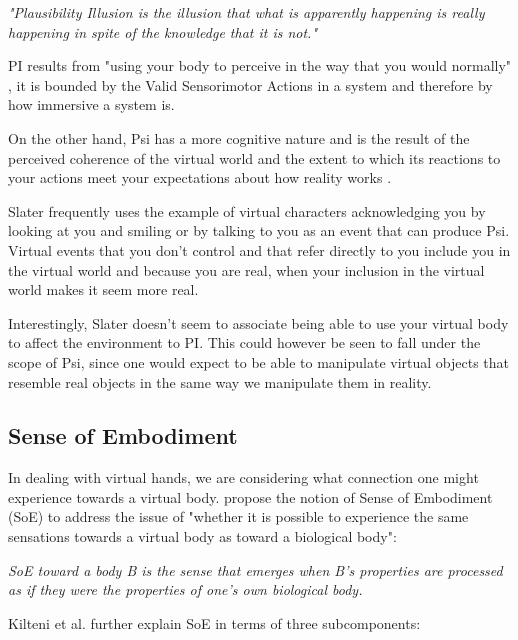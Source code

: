 \begin{displayquote}
\textit{"Plausibility Illusion is the illusion that what is apparently happening is really happening in spite of the knowledge that it is not."}
\end{displayquote}

PI results from "using your body to perceive in the way that you would normally" \parencite{Slater2015}, it is bounded by the Valid Sensorimotor Actions in a system and therefore by how immersive a system is.

On the other hand, Psi has a more cognitive nature and is the result of the perceived coherence of the virtual world and the extent to which its reactions to your actions meet your expectations about how reality works \parencite{Slater2015}.

Slater frequently uses the example of virtual characters acknowledging you by looking at you and smiling or by talking to you as an event that can produce Psi. Virtual events that you don't control and that refer directly to you include you in the virtual world and because you are real, when your inclusion in the virtual world makes it seem more real.

Interestingly, Slater doesn't seem to associate being able to use your virtual body to affect the environment to PI. This could however be seen to fall under the scope of Psi, since one would expect to be able to manipulate virtual objects that resemble real objects in the same way we manipulate them in reality. 

\subsection{Sense of Embodiment}
\label{subsec:embodiment}

In dealing with virtual hands, we are considering what connection one might experience towards a virtual body. \parencite{Kilteni2012} propose the notion of Sense of Embodiment (SoE) to address the issue of "whether it is possible to experience the same sensations towards a virtual body as toward a biological body":

\begin{displayquote}
\textit{SoE toward a body B is the sense that emerges when B's properties are processed as if they were the properties of one's own biological body.}
\end{displayquote}

Kilteni et al. further explain SoE in terms of three subcomponents:

